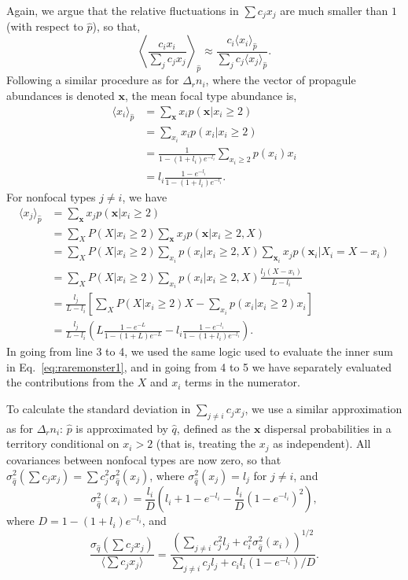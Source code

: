 \documentclass[12pt]{article}
\begin{document}
Again, we argue that the relative fluctuations in $\sum c_j x_j$ are much smaller than $1$ (with respect to $\hat{p}$), so that,
\begin{equation}
\left\langle \frac{c_i x_i}{\sum_j c_j x_j} \right\rangle_{\hat{p}}\approx  \frac{c_i \langle x_i \rangle_{\hat{p}}}{\sum_j c_j \langle x_j\rangle_{\hat{p}}}.\label{eq:meanfielda}
\end{equation}
Following a similar procedure as for $\Delta_r n_i$, where the vector of propagule abundances is denoted ${\mathbf x}$, the mean focal type abundance is, 
\begin{align}
\langle x_i \rangle_{\hat{p}}&=\sum_{\mathbf x} x_i p(\mathbf x|x_i\geq 2)\nonumber \\
&=\sum_{x_i} x_i p(x_i|x_i\geq 2) \nonumber\\
&=\frac{1}{1-(1+l_i)e^{-l_i}}\sum_{x_i\geq 2} p(x_i)x_i\nonumber\\
&=l_i\frac{1-e^{-l_i}}{1-(1+l_i)e^{-l_i}}.
\end{align}
For nonfocal types $j\neq i$, we have
\begin{align}
\langle x_j \rangle_{\hat{p}}&=\sum_{\mathbf x} x_j p(\mathbf x|x_i\geq 2)\nonumber \\
&=\sum_{X}P(X|x_i\geq 2)\sum_{\mathbf x} x_j p({\mathbf x}|x_i\geq 2,X)\nonumber\\
&=\sum_{X}P(X|x_i\geq 2)\sum_{x_i} p(x_i|x_i\geq 2,X) \sum_{\mathbf x_i} x_j p(\mathbf x_i|X_i=X-x_i)\nonumber\\
&=\sum_{X}P(X|x_i\geq 2)\sum_{x_i}p(x_i|x_i\geq 2,X) \frac{l_j(X-x_i)}{L-l_i} \nonumber\\
&=\frac{l_j}{L-l_i}\left[\sum_{X}P(X|x_i\geq 2)X - \sum_{x_i}p(x_i|x_i\geq 2) x_i \right]\nonumber\\
&=\frac{l_j}{L-l_i}\left( L\frac{1-e^{-L}}{1-(1+L)e^{-L}}- l_i\frac{1-e^{-l_i}}{1-(1+l_i)e^{-l_i}}\right).
\end{align}
In going from line 3 to 4, we used the same logic used to evaluate the inner sum in Eq.~\eqref{eq:raremonster1}, and in going from 4 to 5 we have separately evaluated the contributions from the $X$ and $x_i$ terms in the numerator.

To calculate the standard deviation in $\sum_{j\neq i} c_j x_j$, we use a similar approximation as for $\Delta_r n_i$: $\hat{p}$ is approximated by $\hat{q}$, defined as the ${\mathbf x}$ dispersal probabilities in a territory conditional on $x_i>2$ (that is, treating the $x_j$ as independent). All covariances between nonfocal types are now zero, so that $\sigma_{\hat{q}}^2(\sum c_j x_j)=\sum c_j^2 \sigma_{\hat{q}}^2(x_j)$, where $\sigma_{\hat{q}}^2(x_j)=l_j$ for $j\neq i$, and  
\begin{equation}
\sigma_{\hat{q}}^2(x_i)=\frac{l_i}{D}\left(l_i+1-e^{-l_i}-\frac{l_i}{D}\left(1-e^{-l_i}\right)^2\right),
\end{equation}
where $D= 1-(1+l_i)e^{-l_i}$, and 
\begin{equation}
\frac{\sigma_{\hat{q}}(\sum c_j x_j)}{\langle\sum c_j x_j\rangle} = \frac{\left(\sum_{j\neq i} c_j^2 l_j + c_i^2 \sigma_{\hat{q}}^2(x_i)\right)^{1/2}}{\sum_{j\neq i} c_j l_j + c_i l_i (1-e^{-l_i})/D} \label{eq:cva}.
\end{equation}
\end{document}
